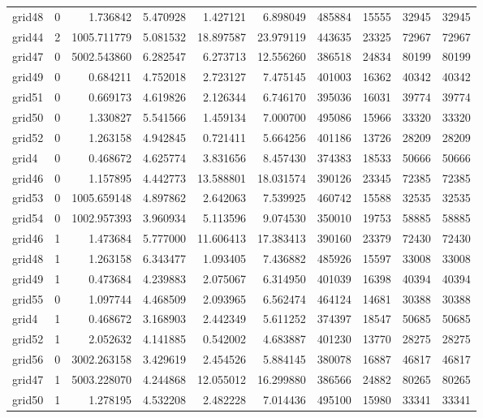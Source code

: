 \begin{longtable}{|l|r|r|r|r|r|r|r|r|r|}
grid48 & 0 & 1.736842 & 5.470928 & 1.427121 & 6.898049 & 485884 & 15555 & 32945 & 32945 \\
grid44 & 2 & 1005.711779 & 5.081532 & 18.897587 & 23.979119 & 443635 & 23325 & 72967 & 72967 \\
grid47 & 0 & 5002.543860 & 6.282547 & 6.273713 & 12.556260 & 386518 & 24834 & 80199 & 80199 \\
grid49 & 0 & 0.684211 & 4.752018 & 2.723127 & 7.475145 & 401003 & 16362 & 40342 & 40342 \\
grid51 & 0 & 0.669173 & 4.619826 & 2.126344 & 6.746170 & 395036 & 16031 & 39774 & 39774 \\
grid50 & 0 & 1.330827 & 5.541566 & 1.459134 & 7.000700 & 495086 & 15966 & 33320 & 33320 \\
grid52 & 0 & 1.263158 & 4.942845 & 0.721411 & 5.664256 & 401186 & 13726 & 28209 & 28209 \\
grid4 & 0 & 0.468672 & 4.625774 & 3.831656 & 8.457430 & 374383 & 18533 & 50666 & 50666 \\
grid46 & 0 & 1.157895 & 4.442773 & 13.588801 & 18.031574 & 390126 & 23345 & 72385 & 72385 \\
grid53 & 0 & 1005.659148 & 4.897862 & 2.642063 & 7.539925 & 460742 & 15588 & 32535 & 32535 \\
grid54 & 0 & 1002.957393 & 3.960934 & 5.113596 & 9.074530 & 350010 & 19753 & 58885 & 58885 \\
grid46 & 1 & 1.473684 & 5.777000 & 11.606413 & 17.383413 & 390160 & 23379 & 72430 & 72430 \\
grid48 & 1 & 1.263158 & 6.343477 & 1.093405 & 7.436882 & 485926 & 15597 & 33008 & 33008 \\
grid49 & 1 & 0.473684 & 4.239883 & 2.075067 & 6.314950 & 401039 & 16398 & 40394 & 40394 \\
grid55 & 0 & 1.097744 & 4.468509 & 2.093965 & 6.562474 & 464124 & 14681 & 30388 & 30388 \\
grid4 & 1 & 0.468672 & 3.168903 & 2.442349 & 5.611252 & 374397 & 18547 & 50685 & 50685 \\
grid52 & 1 & 2.052632 & 4.141885 & 0.542002 & 4.683887 & 401230 & 13770 & 28275 & 28275 \\
grid56 & 0 & 3002.263158 & 3.429619 & 2.454526 & 5.884145 & 380078 & 16887 & 46817 & 46817 \\
grid47 & 1 & 5003.228070 & 4.244868 & 12.055012 & 16.299880 & 386566 & 24882 & 80265 & 80265 \\
grid50 & 1 & 1.278195 & 4.532208 & 2.482228 & 7.014436 & 495100 & 15980 & 33341 & 33341 \\

\end{longtable}
